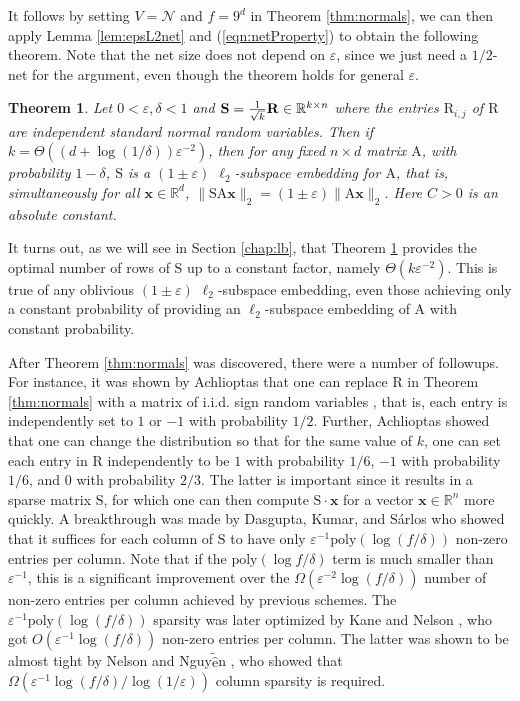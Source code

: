 \documentclass[11pt]{article}
\newtheorem{theorem}{Theorem}
\newcommand{\mat}[1]{{\ensuremath{\bm{\mathrm{#1}}}}}
\def\matA{\mat{A}}
\def\matR{\mat{R}}
\def\matS{\mat{S}}
\def\frac#1#2{{#1\over #2}}
\def\x{{\mathbf x}}
\newcommand{\eps}{\varepsilon}
\newcommand{\poly}{{\mathrm{poly}}}
\begin{document}
It follows by setting $V = \mathcal{N}$ and $f = 9^d$ in Theorem \ref{thm:normals}, 
we can then apply Lemma \ref{lem:epsL2net} and (\ref{eqn:netProperty}) to obtain the following theorem. 
Note that the net size
does not depend on $\eps$, since we just need a $1/2$-net for the argument, even though the theorem holds for
general $\eps$. 
\begin{theorem}\label{thm:gaussianSE}
Let $0 < \eps, \delta < 1$ and $\matS = \frac{1}{\sqrt{k}} \matR \in \mathbb{R}^{k \times n}$ where the entries
$\matR_{i,j}$ of $\matR$ are independent standard normal random variables. Then if $k = \Theta((d+ \log(1/\delta)) \eps^{-2})$,
then for any fixed $n \times d$ matrix $\matA$, with probability $1-\delta$, $\matS$ is a $(1 \pm \eps)$
$\ell_2$-subspace embedding for $\matA$, that is, simultaneously for all $\x \in \mathbb{R}^d$,
$\|\matS \matA \x\|_2 = (1 \pm \eps)\|\matA \x\|_2$. Here $C > 0$ is an absolute constant. 
\end{theorem}
It turns out, as we will see in Section \ref{chap:lb}, that Theorem \ref{thm:gaussianSE} provides the
optimal number of rows of $\matS$ up to a constant factor, namely $\Theta(k \eps^{-2})$. This is true of
any oblivious $(1 \pm \eps)$ $\ell_2$-subspace embedding, even those achieving only a constant probability
of providing an $\ell_2$-subspace embedding of $\matA$ with constant probability. 

After Theorem \ref{thm:normals} was discovered, there were a number of followups. For instance, it was
shown by Achlioptas that one can replace $\matR$ in Theorem \ref{thm:normals} with a matrix of i.i.d. sign random variables \cite{Ach03}, 
that is, each entry is independently set to $1$ or $-1$ with probability $1/2$. Further, Achlioptas 
showed that one can change the distribution so that for the same value of $k$, one can set each entry
in $\matR$ independently to be $1$ with probability $1/6$, $-1$ with probability $1/6$, and $0$ 
with probability $2/3$.
The latter is important since it results in a sparse matrix $\matS$, for which one can then compute $\matS \cdot \x$ for
a vector $\x \in \mathbb{R}^n$ more quickly. A breakthrough was made by Dasgupta, Kumar, and S\'arlos \cite{dks10}
who showed that it suffices for each column of $\matS$ to have only $\eps^{-1} \poly(\log (f/\delta))$ non-zero entries
per column. Note that if the $\poly(\log f/\delta)$ term is much smaller than $\eps^{-1}$, this is a significant
improvement over the $\Omega(\eps^{-2} \log(f/\delta))$ number of non-zero entries per column achieved by previous
schemes. The $\eps^{-1} \poly(\log(f/\delta))$ sparsity was later optimized by Kane and Nelson \cite{kn14}, who got
$O(\eps^{-1} \log(f/\delta))$ non-zero entries per column. The latter was shown to be almost tight by
Nelson and Nguy$\tilde{\hat{\mbox{e}}}$n \cite{nn13lb}, who showed that $\Omega(\eps^{-1} \log(f/\delta)/\log(1/\varepsilon))$ column sparsity is required. 
\end{document}
